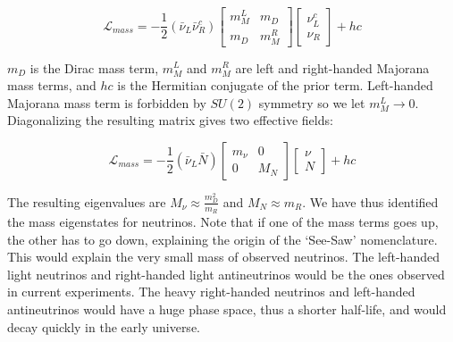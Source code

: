 

\begin{equation}\label{mass_lagrangian}
\mathcal{L}_{mass} = -\frac{1}{2}(\bar{\nu}_L\bar{\nu}_R^c) \begin{bmatrix} m_M^L & m_D \\ m_D & m_M^R \end{bmatrix} \begin{bmatrix} \nu_L^c \\ \nu_R \end{bmatrix} + hc
\end{equation}

$m_D$ is the Dirac mass term, $m_M^L$ and $m_M^R$ are left and right-handed Majorana mass terms, and $hc$ is the Hermitian conjugate of the prior term. Left-handed Majorana mass term is forbidden by $SU (2)$ symmetry so we let $m_M^L \rightarrow 0$. Diagonalizing the resulting matrix gives two effective fields: 

\begin{equation}\label{mass_lagrangian_reduced}
\mathcal{L}_{mass} = -\frac{1}{2}(\bar{\nu}_L\bar{N}) \begin{bmatrix} m_\nu & 0 \\ 0 & M_N \end{bmatrix} \begin{bmatrix} \nu \\ N \end{bmatrix} + hc
\end{equation}

The resulting eigenvalues are $M_\nu \approx \frac{m^2_D}{m_R}$ and $M_N \approx m_R$. We have thus identified the mass eigenstates for neutrinos. Note that if one of the mass terms goes up, the other has to go down, explaining the origin of the `See-Saw' nomenclature. This would explain the very small mass of observed neutrinos. The left-handed light neutrinos and right-handed light antineutrinos would be the ones observed in current experiments. The heavy right-handed neutrinos and left-handed antineutrinos would have a huge phase space, thus a shorter half-life, and would decay quickly in the early universe.

